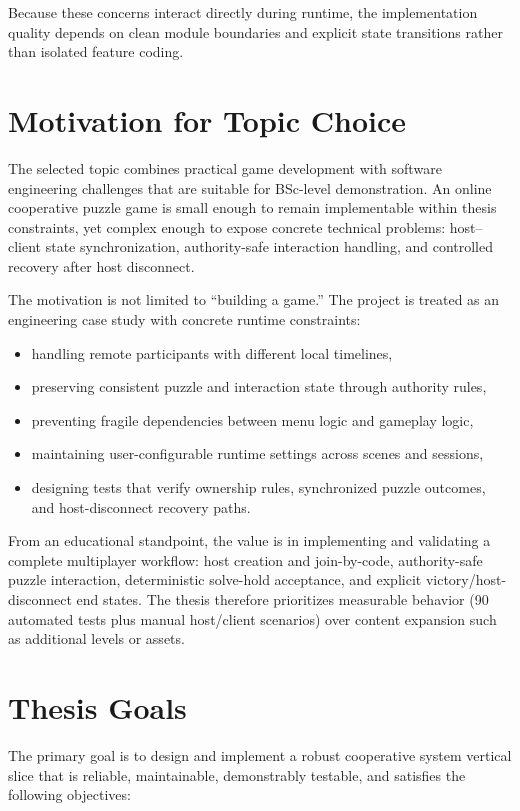 Because these concerns interact directly during runtime, the implementation quality depends on clean module boundaries and explicit state transitions rather than isolated feature coding.

\section{Motivation for Topic Choice}
The selected topic combines practical game development with software engineering challenges that are suitable for BSc-level demonstration. An online cooperative puzzle game is small enough to remain implementable within thesis constraints, yet complex enough to expose concrete technical problems: host--client state synchronization, authority-safe interaction handling, and controlled recovery after host disconnect.

The motivation is not limited to ``building a game.'' The project is treated as an engineering case study with concrete runtime constraints:
\begin{itemize}
\item handling remote participants with different local timelines,
\item preserving consistent puzzle and interaction state through authority rules,
\item preventing fragile dependencies between menu logic and gameplay logic,
\item maintaining user-configurable runtime settings across scenes and sessions,
\item designing tests that verify ownership rules, synchronized puzzle outcomes, and host-disconnect recovery paths.
\end{itemize}

From an educational standpoint, the value is in implementing and validating a complete multiplayer workflow: host creation and join-by-code, authority-safe puzzle interaction, deterministic solve-hold acceptance, and explicit victory/host-disconnect end states. The thesis therefore prioritizes measurable behavior (90 automated tests plus manual host/client scenarios) over content expansion such as additional levels or assets.

\section{Thesis Goals}
The primary goal is to design and implement a robust cooperative system vertical slice that is reliable, maintainable, demonstrably testable, and satisfies the following objectives:

